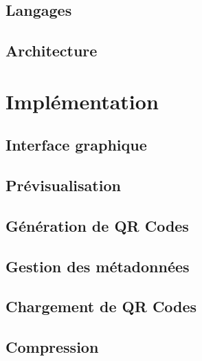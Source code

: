 \documentclass{report}
\begin{document}
		\subsection{Langages}
			 \label{langages}
			
		\subsection{Architecture}		
			 \label{architecture}
				
	\newpage
	\section{Implémentation}
		
		\subsection{Interface graphique}
			 \label{interfaceGraphique}
			
		\subsection{Prévisualisation}
			 \label{previsualisation}
			
		\subsection{Génération de QR Codes}
			 \label{generation}
		
		\newpage
		\subsection{Gestion des métadonnées}
			 \label{metadonnees}
			
		\subsection{Chargement de QR Codes}
			 \label{chargement}
			
		\newpage
		\subsection{Compression}
			 \label{compression}
		
\end{document}
